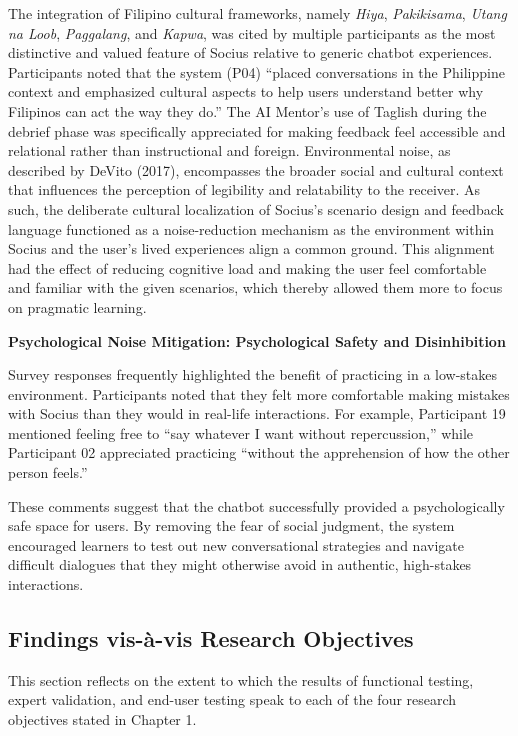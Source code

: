 The integration of Filipino cultural frameworks, namely \textit{Hiya}, 
\textit{Pakikisama}, \textit{Utang na Loob}, \textit{Paggalang}, and 
\textit{Kapwa}, was cited by multiple participants as the most distinctive and 
valued feature of Socius relative to generic chatbot experiences. Participants noted 
that the system (P04) ``placed conversations in the Philippine context and emphasized 
cultural aspects to help users understand better why Filipinos can act the way they 
do.'' The AI Mentor's use of Taglish during the debrief phase was specifically 
appreciated for making feedback feel accessible and relational rather than 
instructional and foreign. Environmental noise, as described by DeVito (2017), 
encompasses the broader social and cultural context that influences the perception of 
legibility and relatability to the receiver. As such, the deliberate cultural localization of Socius's scenario design and feedback 
language functioned as a noise-reduction mechanism as the environment within Socius and the user's lived experiences
align a common ground. This alignment had the effect of reducing cognitive load and making the user feel
comfortable and familiar with the given scenarios, which thereby allowed them more to focus on pragmatic learning.

\noindent\textbf{Psychological Noise Mitigation: Psychological Safety and Disinhibition}

Survey responses frequently highlighted the benefit of practicing in a low-stakes environment. Participants noted that they felt more comfortable making mistakes with Socius than they would in real-life interactions. For example, Participant 19 mentioned feeling free to ``say whatever I want without repercussion,'' while Participant 02 appreciated practicing ``without the apprehension of how the other person feels.''

These comments suggest that the chatbot successfully provided a psychologically safe space for users. By removing the fear of social judgment, the system encouraged learners to test out new conversational strategies and navigate difficult dialogues that they might otherwise avoid in authentic, high-stakes interactions.


\subsection{Findings vis-à-vis Research Objectives}

This section reflects on the extent to which the results of functional testing, 
expert validation, and end-user testing speak to each of the four research 
objectives stated in Chapter 1.

